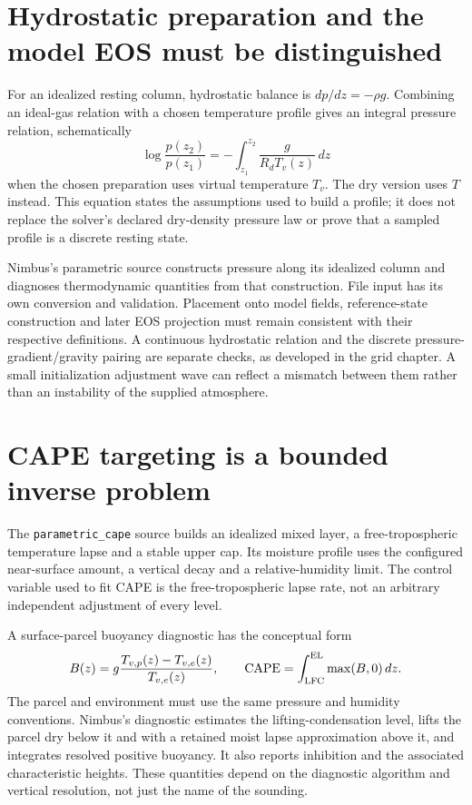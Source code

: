 \section{Hydrostatic preparation and the model EOS must be distinguished}

For an idealized resting column, hydrostatic balance is
$dp/dz=-\rho g$. Combining an ideal-gas relation with a chosen temperature
profile gives an integral pressure relation, schematically
\[
 \log\frac{p(z_2)}{p(z_1)}
 =-\int_{z_1}^{z_2}\frac{g}{R_dT_v(z)}\,dz
\]
when the chosen preparation uses virtual temperature $T_v$. The dry version
uses $T$ instead. This equation states the assumptions used to build a profile;
it does not replace the solver's declared dry-density pressure law or prove
that a sampled profile is a discrete resting state.

Nimbus's parametric source constructs pressure along its idealized column and
diagnoses thermodynamic quantities from that construction. File input has its
own conversion and validation. Placement onto model fields, reference-state
construction and later EOS projection must remain consistent with their
respective definitions. A continuous hydrostatic relation and the discrete
pressure-gradient/gravity pairing are separate checks, as developed in the grid
chapter. A small initialization adjustment wave can reflect a mismatch between
them rather than an instability of the supplied atmosphere.

\section{CAPE targeting is a bounded inverse problem}

The \texttt{parametric\_cape} source builds an idealized mixed layer, a
free-tropospheric temperature lapse and a stable upper cap. Its moisture profile
uses the configured near-surface amount, a vertical decay and a relative-humidity
limit. The control variable used to fit CAPE is the free-tropospheric lapse rate,
not an arbitrary independent adjustment of every level.

A surface-parcel buoyancy diagnostic has the conceptual form
\[
 B(z)=g\frac{T_{v,p}(z)-T_{v,e}(z)}{T_{v,e}(z)},\qquad
 \mathrm{CAPE}=\int_{\rm LFC}^{\rm EL}\max(B,0)\,dz.
\]
The parcel and environment must use the same pressure and humidity conventions.
Nimbus's diagnostic estimates the lifting-condensation level, lifts the parcel
dry below it and with a retained moist lapse approximation above it, and
integrates resolved positive buoyancy. It also reports inhibition and the
associated characteristic heights. These quantities depend on the diagnostic
algorithm and vertical resolution, not just the name of the sounding.


